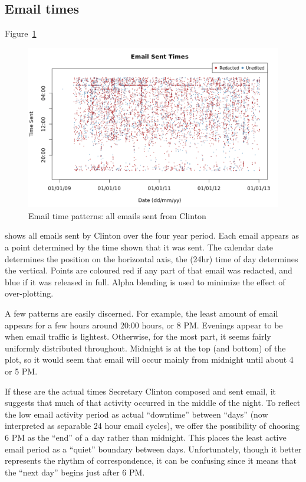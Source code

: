 \documentclass[journal]{vgtc}                %
\begin{document}
\subsection{Email times}
\label{sect:Displays:times}
Figure~\ref{fig:TimesAll}  
\begin{figure}[h]
\begin{center}
\includegraphics[width=0.95\linewidth]{DailyFullTimeFromClinton}
\caption{Email time patterns: all emails sent from Clinton}
\label{fig:TimesAll}
\end{center}
\end{figure}
shows all emails sent by Clinton over the four year period.  Each email appears as a point determined by the time shown that it was sent.  The calendar date determines the position on the horizontal axis,  the (24hr) time of day determines the vertical.   Points are coloured red if any part of that email was redacted, and blue if it was released in full.   Alpha blending is used to minimize the effect of over-plotting.
 
A few patterns are easily discerned.  For example, the least amount of email appears for a few hours around  20:00 hours, or 8 PM.  Evenings appear to be when email traffic is lightest.  Otherwise, for the most part, it seems fairly uniformly distributed throughout.  Midnight is at the top (and bottom) of the plot, so it would seem that email will occur mainly from midnight until about 4 or 5 PM.   

If these are the actual times Secretary Clinton composed and sent email, it suggests that much of that activity occurred in the middle of the night.  To reflect the low email activity period as actual ``downtime'' between ``days'' (now interpreted as separable 24 hour email cycles),  we offer the possibility of choosing 6 PM as the ``end'' of a day rather than midnight.   This places the least active email period as a ``quiet'' boundary between days.   Unfortunately, though it better represents the rhythm of correspondence, it can be confusing since it means that the ``next day''  begins just after 6 PM. 
\end{document}
